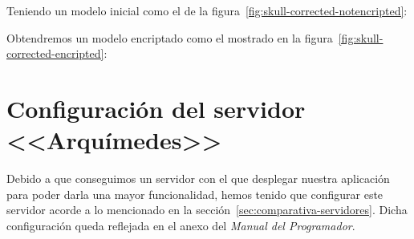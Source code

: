 Teniendo un modelo inicial como el de la figura~\ref{fig:skull-corrected-notencripted}:

Obtendremos un modelo encriptado como el mostrado en la figura~\ref{fig:skull-corrected-encripted}:

\section{Configuración del servidor <<Arquímedes>>}
Debido a que conseguimos un servidor con el que desplegar nuestra aplicación para poder darla una mayor funcionalidad, hemos tenido que configurar este servidor acorde a lo mencionado en la sección~\ref{sec:comparativa-servidores}. Dicha configuración queda reflejada en el anexo del \textit{Manual del Programador}.